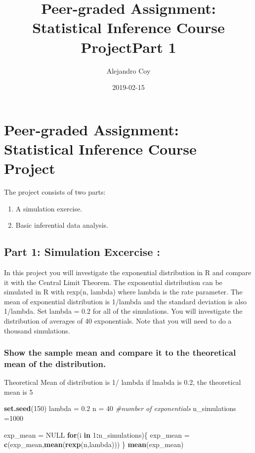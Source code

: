 \documentclass[]{article}
\title{Peer-graded Assignment: Statistical Inference Course ProjectPart 1}
\author{Alejandro Coy}
\date{2019-02-15}
\newenvironment{Shaded}{\begin{snugshade}}{\end{snugshade}}
\newcommand{\KeywordTok}[1]{\textcolor[rgb]{0.13,0.29,0.53}{\textbf{#1}}}
\newcommand{\DecValTok}[1]{\textcolor[rgb]{0.00,0.00,0.81}{#1}}
\newcommand{\FloatTok}[1]{\textcolor[rgb]{0.00,0.00,0.81}{#1}}
\newcommand{\StringTok}[1]{\textcolor[rgb]{0.31,0.60,0.02}{#1}}
\newcommand{\CommentTok}[1]{\textcolor[rgb]{0.56,0.35,0.01}{\textit{#1}}}
\newcommand{\OtherTok}[1]{\textcolor[rgb]{0.56,0.35,0.01}{#1}}
\newcommand{\ControlFlowTok}[1]{\textcolor[rgb]{0.13,0.29,0.53}{\textbf{#1}}}
\newcommand{\OperatorTok}[1]{\textcolor[rgb]{0.81,0.36,0.00}{\textbf{#1}}}
\newcommand{\NormalTok}[1]{#1}
\providecommand{\tightlist}{%
  \setlength{\itemsep}{0pt}\setlength{\parskip}{0pt}}
\begin{document}
\maketitle

\section{Peer-graded Assignment: Statistical Inference Course
Project}\label{peer-graded-assignment-statistical-inference-course-project}

The project consists of two parts:

\begin{enumerate}
\def\labelenumi{\arabic{enumi}.}
\tightlist
\item
  A simulation exercise.
\item
  Basic inferential data analysis.
\end{enumerate}

\subsection{Part 1: Simulation Excercise
:}\label{part-1-simulation-excercise}

In this project you will investigate the exponential distribution in R
and compare it with the Central Limit Theorem. The exponential
distribution can be simulated in R with rexp(n, lambda) where lambda is
the rate parameter. The mean of exponential distribution is 1/lambda and
the standard deviation is also 1/lambda. Set lambda = 0.2 for all of the
simulations. You will investigate the distribution of averages of 40
exponentials. Note that you will need to do a thousand simulations.

\subsubsection{Show the sample mean and compare it to the theoretical
mean of the
distribution.}\label{show-the-sample-mean-and-compare-it-to-the-theoretical-mean-of-the-distribution.}

Theoretical Mean of distribution is 1/ lambda if lmabda is 0.2, the
theoretical mean is 5

\begin{Shaded}
\begin{Highlighting}[]
\KeywordTok{set.seed}\NormalTok{(}\DecValTok{150}\NormalTok{)}
\NormalTok{lambda =}\StringTok{ }\FloatTok{0.2}
\NormalTok{n =}\StringTok{ }\DecValTok{40} \CommentTok{#number of exponentials}
\NormalTok{n_simulations =}\DecValTok{1000}

\NormalTok{exp_mean =}\StringTok{ }\OtherTok{NULL}
\ControlFlowTok{for}\NormalTok{(i }\ControlFlowTok{in} \DecValTok{1}\OperatorTok{:}\NormalTok{n_simulations)\{}
\NormalTok{  exp_mean =}\StringTok{ }\KeywordTok{c}\NormalTok{(exp_mean,}\KeywordTok{mean}\NormalTok{(}\KeywordTok{rexp}\NormalTok{(n,lambda)))}
\NormalTok{\}}
\KeywordTok{mean}\NormalTok{(exp_mean)}
\end{Highlighting}
\end{Shaded}
\end{document}
